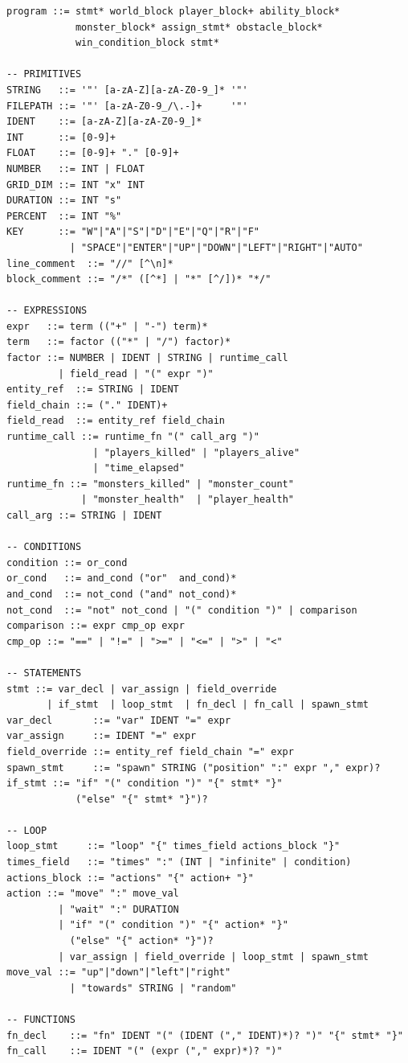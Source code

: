 \documentclass[12pt,a4paper]{article}
\begin{document}
\begin{lstlisting}[style=bnf]
program ::= stmt* world_block player_block+ ability_block*
            monster_block* assign_stmt* obstacle_block*
            win_condition_block stmt*

-- PRIMITIVES
STRING   ::= '"' [a-zA-Z][a-zA-Z0-9_]* '"'
FILEPATH ::= '"' [a-zA-Z0-9_/\.-]+     '"'
IDENT    ::= [a-zA-Z][a-zA-Z0-9_]*
INT      ::= [0-9]+
FLOAT    ::= [0-9]+ "." [0-9]+
NUMBER   ::= INT | FLOAT
GRID_DIM ::= INT "x" INT
DURATION ::= INT "s"
PERCENT  ::= INT "%"
KEY      ::= "W"|"A"|"S"|"D"|"E"|"Q"|"R"|"F"
           | "SPACE"|"ENTER"|"UP"|"DOWN"|"LEFT"|"RIGHT"|"AUTO"
line_comment  ::= "//" [^\n]*
block_comment ::= "/*" ([^*] | "*" [^/])* "*/"

-- EXPRESSIONS
expr   ::= term (("+" | "-") term)*
term   ::= factor (("*" | "/") factor)*
factor ::= NUMBER | IDENT | STRING | runtime_call
         | field_read | "(" expr ")"
entity_ref  ::= STRING | IDENT
field_chain ::= ("." IDENT)+
field_read  ::= entity_ref field_chain
runtime_call ::= runtime_fn "(" call_arg ")"
               | "players_killed" | "players_alive"
               | "time_elapsed"
runtime_fn ::= "monsters_killed" | "monster_count"
             | "monster_health"  | "player_health"
call_arg ::= STRING | IDENT

-- CONDITIONS
condition ::= or_cond
or_cond   ::= and_cond ("or"  and_cond)*
and_cond  ::= not_cond ("and" not_cond)*
not_cond  ::= "not" not_cond | "(" condition ")" | comparison
comparison ::= expr cmp_op expr
cmp_op ::= "==" | "!=" | ">=" | "<=" | ">" | "<"

-- STATEMENTS
stmt ::= var_decl | var_assign | field_override
       | if_stmt  | loop_stmt  | fn_decl | fn_call | spawn_stmt
var_decl       ::= "var" IDENT "=" expr
var_assign     ::= IDENT "=" expr
field_override ::= entity_ref field_chain "=" expr
spawn_stmt     ::= "spawn" STRING ("position" ":" expr "," expr)?
if_stmt ::= "if" "(" condition ")" "{" stmt* "}"
            ("else" "{" stmt* "}")?

-- LOOP
loop_stmt     ::= "loop" "{" times_field actions_block "}"
times_field   ::= "times" ":" (INT | "infinite" | condition)
actions_block ::= "actions" "{" action+ "}"
action ::= "move" ":" move_val
         | "wait" ":" DURATION
         | "if" "(" condition ")" "{" action* "}"
           ("else" "{" action* "}")?
         | var_assign | field_override | loop_stmt | spawn_stmt
move_val ::= "up"|"down"|"left"|"right"
           | "towards" STRING | "random"

-- FUNCTIONS
fn_decl    ::= "fn" IDENT "(" (IDENT ("," IDENT)*)? ")" "{" stmt* "}"
fn_call    ::= IDENT "(" (expr ("," expr)*)? ")"


\end{lstlisting}
\end{document}
